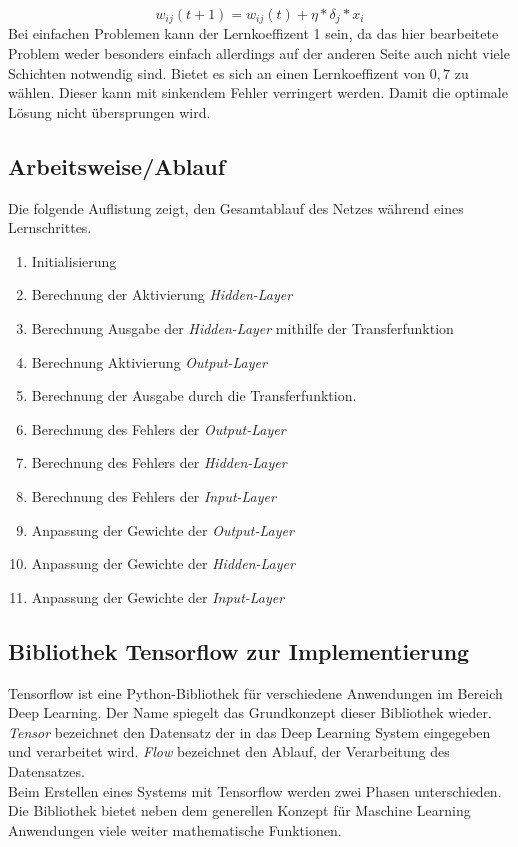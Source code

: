 \begin{equation}
    w_{ij}(t+1) = w_{ij}(t) + \eta * \delta_j*x_i
    \label{eqn:gewichte}
\end{equation}
Bei einfachen Problemen kann der Lernkoeffizent 1 sein, da das hier 
bearbeitete Problem weder besonders einfach allerdings auf der anderen Seite auch 
nicht viele Schichten notwendig sind. Bietet es sich an einen Lernkoeffizent von 
$0,7$ zu wählen. Dieser kann mit sinkendem Fehler verringert werden. 
Damit die optimale Lösung nicht übersprungen wird.

\subsection{Arbeitsweise/Ablauf}
Die folgende Auflistung zeigt, den Gesamtablauf des Netzes während eines 
Lernschrittes.
\begin{enumerate}
    \item Initialisierung
    \item Berechnung der Aktivierung \textit{Hidden-Layer}
    \item Berechnung Ausgabe der \textit{Hidden-Layer} mithilfe der Transferfunktion
    \item Berechnung Aktivierung \textit{Output-Layer}
    \item Berechnung der Ausgabe durch die Transferfunktion.
    \item Berechnung des Fehlers der \textit{Output-Layer}
    \item Berechnung des Fehlers der \textit{Hidden-Layer}
    \item Berechnung des Fehlers der \textit{Input-Layer}
    \item Anpassung der Gewichte der \textit{Output-Layer}
    \item Anpassung der Gewichte der \textit{Hidden-Layer}
    \item Anpassung der Gewichte der \textit{Input-Layer}
\end{enumerate}

\subsection{Bibliothek Tensorflow zur Implementierung}
Tensorflow ist eine Python-Bibliothek für verschiedene Anwendungen im Bereich Deep Learning. 
Der Name spiegelt das Grundkonzept dieser Bibliothek wieder. 
\textit{Tensor} bezeichnet den Datensatz der in das Deep Learning System 
eingegeben und verarbeitet wird. \textit{Flow} bezeichnet den Ablauf, 
der Verarbeitung des Datensatzes. \\
Beim Erstellen eines Systems mit Tensorflow werden zwei Phasen 
unterschieden. 
Die Bibliothek bietet neben dem generellen Konzept für Maschine Learning Anwendungen 
viele weiter mathematische Funktionen. 
\cite{tf:2018}